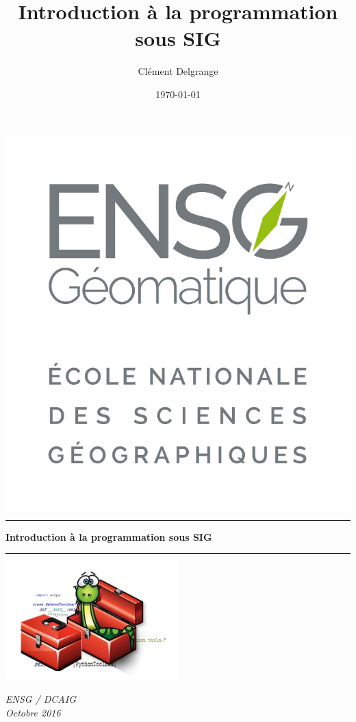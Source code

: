 \documentclass[11pt]{article}
\title{Introduction à la programmation sous SIG}
\author{Clément Delgrange}
\date{\today}
\begin{document}
	
	
\begin{titlepage}
	\begin{sffamily}
		\begin{flushleft}
			\includegraphics[scale=0.15]{img/cours/logo_ensg.png}\\[1.5cm]
		\end{flushleft}
		\begin{flushright}
		\end{flushright}
		
		\vspace{1cm}
		
		\begin{center}
			\hrule
				\vspace{0.5cm}
				{\LARGE \bfseries Introduction à la programmation sous SIG}
				\vspace{0.7cm}
			\hrule
			
			\vspace{3cm}
			\includegraphics[width=0.5\textwidth]{img/cours/img1.jpg}
			\vspace{4cm}
		
			\large \textit{ENSG / DCAIG}\\
			\small \textit{Octobre 2016}
		\end{center}
	\end{sffamily}
\end{titlepage}
\end{document}
